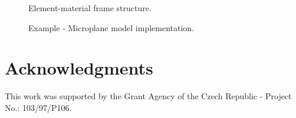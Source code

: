 \documentclass[12pt,draft]{article}
\begin{document}
\begin{figure}[tb]
\begin{center}\end{center}
\caption{Element-material frame  structure.}
\label{materelementFrame1}
\end{figure}

\begin{figure}[tb]
\begin{center}\end{center}
\caption{Example - Microplane model implementation.}
\label{microplaneFig}
\end{figure}



\clearpage



\section*{Acknowledgments}
This work was supported by the Grant Agency of the Czech Republic -
Project No.: 103/97/P106.
\end{document}
